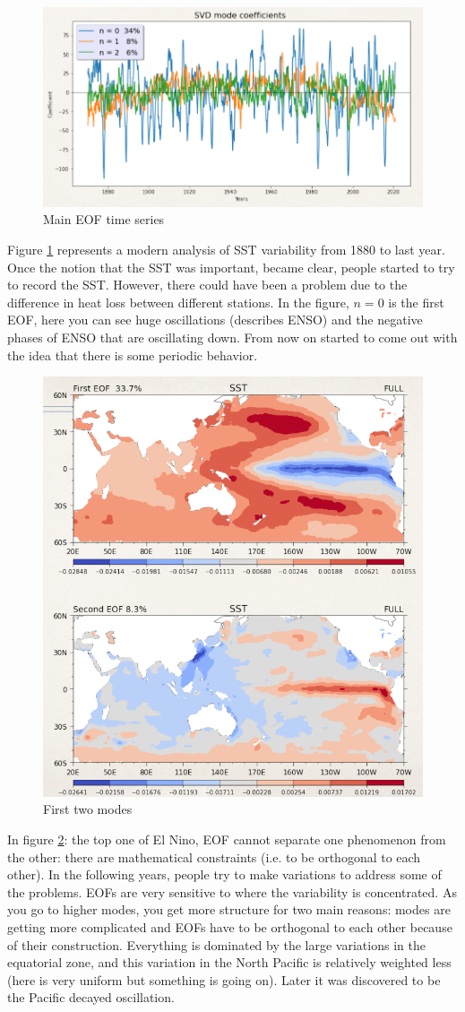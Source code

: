 \begin{figure}[htp!]
	\centering
	\includegraphics[width=0.5\linewidth]{uploads/Screenshot 2024-11-18 164205.png}
	\caption{Main EOF time series}
	\label{fig:eof time series}
\end{figure}
Figure \ref{fig:eof time series} represents a modern analysis of SST variability from 1880 to last year. Once the notion that the SST was important, became clear, people started to try to record the SST. However, there could have been a problem due to the difference in heat loss between different stations. In the figure, $n=0$ is the first EOF, here you can see huge oscillations (describes ENSO) and the negative phases of ENSO that are oscillating down. From now on started to come out with the idea that there is some periodic behavior.
\begin{figure}[htp!]
	\centering
	\includegraphics[width=0.4\linewidth]{uploads/Screenshot 2024-11-18 164916.png}
	\caption{First two modes}
	\label{fig:first two modes}
\end{figure}
In figure \ref{fig:first two modes}: the top one of El Nino, EOF cannot separate one phenomenon from the other: there are mathematical constraints (i.e. to be orthogonal to each other). In the following  years, people try to make variations to address some of the problems. EOFs are very sensitive to where the variability is concentrated. As you go to higher modes, you get more structure for two main reasons: modes are getting more complicated and EOFs have to be orthogonal to each other because of their construction. Everything is dominated by the large variations in the equatorial zone, and this variation in the North Pacific is relatively weighted less (here is very uniform but something is going on). Later it was discovered to be the Pacific decayed oscillation.

